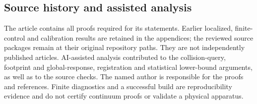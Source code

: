 \documentclass[11pt]{amsart}
\theoremstyle{definition}\newtheorem{definition}[theorem]{Definition}
\theoremstyle{remark}\newtheorem{remark}[theorem]{Remark}
\numberwithin{equation}{section}
\begin{document}
\subsection*{Source history and assisted analysis}
The article contains all proofs required for its statements. Earlier
localized, finite-control and calibration results are retained in the
appendices; the reviewed source packages remain at their original
repository paths. They are not independently published articles.
AI-assisted analysis contributed to the collision-query, footprint and
global-response, registration and statistical lower-bound arguments,
as well as to the source checks. The named author is
responsible for the proofs and references. Finite diagnostics and a
successful build are reproducibility evidence and do not certify
continuum proofs or validate a physical apparatus.

\end{document}
